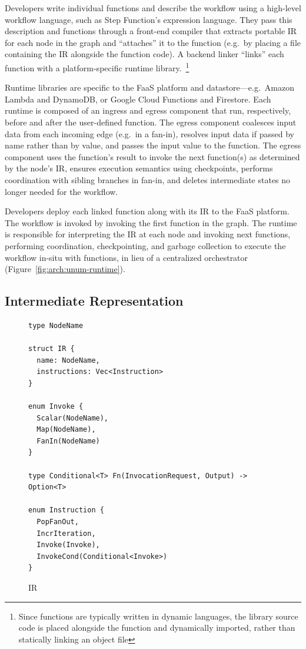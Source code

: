 Developers write individual functions and describe the workflow using a
high-level workflow language, such as Step Function's expression language. They
pass this description and functions through a front-end \name{} compiler that
extracts portable \name{} IR for each node in the graph and ``attaches'' it to
the function (e.g.\ by placing a file containing the IR alongside the function
code). A backend \name{} linker ``links'' each function with a
platform-specific \name{} runtime library.~\footnote{Since functions are
typically written in dynamic languages, the \name{} library source code is
placed alongside the function and dynamically imported, rather than statically
linking an object file}

Runtime libraries are specific to the FaaS platform and datastore---e.g.\ Amazon
Lambda and DynamoDB, or Google Cloud Functions and Firestore. Each runtime is
composed of an ingress and egress component that run, respectively, before and
after the user-defined function. The egress component coalesces input data from
each incoming edge (e.g.\ in a fan-in), resolves input data if passed by name
rather than by value, and passes the input value to the function. The egress
component uses the function's result to invoke the next function(s) as
determined by the node's IR, ensures execution semantics using checkpoints,
performs coordination with sibling branches in fan-in, and deletes intermediate
states no longer needed for the workflow.

Developers deploy each linked function along with its IR to the FaaS platform.
The workflow is invoked by invoking the first function in the graph.  The
\name{} runtime is responsible for interpreting the \name{} IR at each node and
invoking next functions, performing coordination, checkpointing, and garbage
collection to execute the workflow in-situ with functions, in lieu of a
centralized orchestrator (Figure~\ref{fig:arch:unum-runtime}).

\subsection{\name{} Intermediate Representation}\label{sec:design:ir}

\begin{figure}[t!]
    \centering
    \begin{verbatim}
type NodeName

struct IR {
  name: NodeName,
  instructions: Vec<Instruction>
}

enum Invoke {
  Scalar(NodeName),
  Map(NodeName),
  FanIn(NodeName)
}

type Conditional<T> Fn(InvocationRequest, Output) -> Option<T>

enum Instruction {
  PopFanOut,
  IncrIteration,
  Invoke(Invoke),
  InvokeCond(Conditional<Invoke>)
}
    \end{verbatim}
    \caption{\name{} IR}
    \label{fig:design:irschema}
\end{figure}

